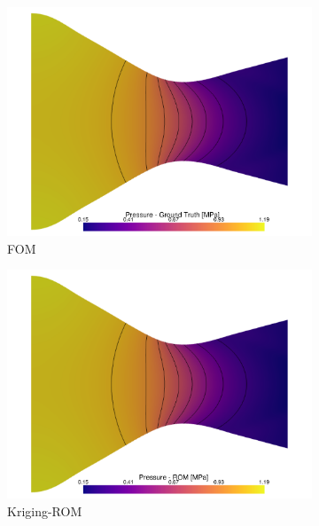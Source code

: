 \documentclass[tg, EN]{ufabcFHZh_tg}
\begin{document}
\begin{figure}[H]
    \centering
    \begin{subfigure}[b]{0.32\textwidth}
        \centering
        \includegraphics[width=\textwidth]{Figuras/kriging_ground_truth_pressure.pdf}
        \caption{FOM}
    \end{subfigure}
    \hfill
    \begin{subfigure}[b]{0.32\textwidth}
        \centering
        \includegraphics[width=\textwidth]{Figuras/kriging_prediction_pressure.pdf}
        \caption{Kriging-ROM}
    \end{subfigure}
    \hfill
    \begin{subfigure}[b]{0.32\textwidth}
        \centering

\end{subfigure}
\end{figure}
\end{document}
